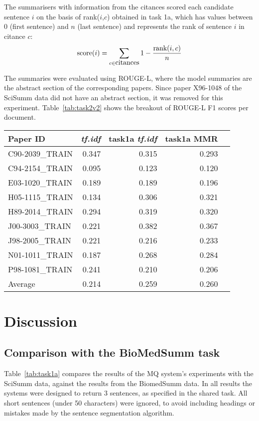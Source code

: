 \documentclass[11pt]{article}
\begin{document}
The summarisers with information from the citances scored each candidate sentence $i$ on the basis of rank($i$,$c$) obtained in task 1a, which has values between 0 (first sentence) and $n$ (last sentence) and represents the rank of sentence $i$ in citance $c$:
$$
\hbox{score}(i) = \sum_{c\in\hbox{citances}}1-\frac{\hbox{rank}(i,c)}{n}
$$

The summaries were evaluated using ROUGE-L, where the model summaries are the abstract section of the corresponding papers. Since paper X96-1048 of the SciSumm data did not have an abstract section, it was removed for this experiment. 
Table~\ref{tab:task2v2} shows the breakout of ROUGE-L F1 scores per document.

\begin{table*}
  \centering
  \begin{tabular}{l|r|rrr}
Paper ID & \emph{tf.idf} & task1a \emph{tf.idf}  & task1a MMR\\
\hline
C90-2039\_TRAIN & 0.347 & 0.315 & 0.293\\
C94-2154\_TRAIN & 0.095 & 0.123 & 0.120\\
E03-1020\_TRAIN & 0.189 & 0.189 & 0.196\\
H05-1115\_TRAIN & 0.134 & 0.306 & 0.321\\
H89-2014\_TRAIN & 0.294 & 0.319 & 0.320\\
J00-3003\_TRAIN & 0.221 & 0.382 & 0.367\\
J98-2005\_TRAIN & 0.221 & 0.216 & 0.233\\
N01-1011\_TRAIN & 0.187 & 0.268 & 0.284\\
P98-1081\_TRAIN & 0.241 & 0.210 & 0.206\\
\hline
Average & 0.214 & 0.259 & 0.260
  \end{tabular}
  \caption{ROUGE-L F1 results for summaries generated by the MQ system}
  \label{tab:task2v2}
\end{table*}


\section{Discussion}
\subsection{Comparison with the BioMedSumm task}
Table~\ref{tab:task1a} compares the results of the MQ system's experiments with the SciSumm data, against the results from the BiomedSumm data. In all results the systems were designed to return 3 sentences, as specified in the shared task. All short sentences (under 50 characters) were ignored, to avoid including headings or mistakes made by the sentence segmentation algorithm.
\end{document}
